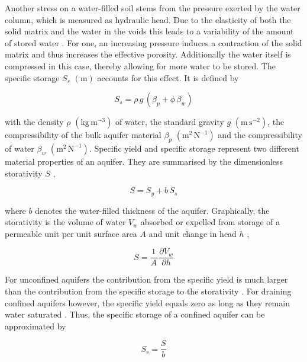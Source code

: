 Another stress on a water-filled soil stems from the pressure exerted by the water column, which is measured as hydraulic head. 
Due to the elasticity of both the solid matrix and the water in the voids this leads to a variability of the amount of stored water \parencite{Fetter.2001}. 
For one, an increasing pressure induces a contraction of the solid matrix and thus increases the effective porosity. 
Additionally the water itself is compressed in this case, thereby allowing for more water to be stored. 
The specific storage $S_s$ $(\textrm{m})$ accounts for this effect. 
It is defined by

\begin{equation}
    S_s = \rho \, g \, \left( \beta_p + \phi \, \beta_w \right)
\end{equation}

\noindent with the density $\rho$ $(\textrm{kg} \, \textrm{m}^{-3})$ of water, the standard gravity $g$ $(\textrm{m} \, \textrm{s}^{-2})$, the compressibility of the bulk aquifer material $\beta_p$ $(\textrm{m}^{2} \, \textrm{N}^{-1})$ and the compressibility of water $\beta_w$ $(\textrm{m}^{2} \, \textrm{N}^{-1})$. 
Specific yield and specific storage represent two different material properties of an aquifer. 
They are summarised by the dimensionless storativity $S$ \parencite{Fetter.2001},

\begin{equation}
    \label{Eq-Storativity}
    S = S_y + b \, S_s
\end{equation}

\noindent where $b$ denotes the water-filled thickness of the aquifer. 
Graphically, the storativity is the volume of water $V_w$ absorbed or expelled from storage of a permeable unit per unit surface area $A$ and unit change in head $h$ \parencite{Fetter.2001},

\begin{equation}
    S = \frac{1}{A} \, \frac{\partial V_w}{\partial h}
\end{equation}

For unconfined aquifers the contribution from the specific yield is much larger than the contribution from the specific storage to the storativity \parencite{Todd.2005}. %
For draining confined aquifers however, the specific yield equals zero as long as they remain water saturated \parencite{Fetter.2001}. 
Thus, the specific storage of a confined aquifer can be approximated by

\begin{equation}
    \label{Eq-SsSy}
    S_s = \frac{S}{b} %
\end{equation}

